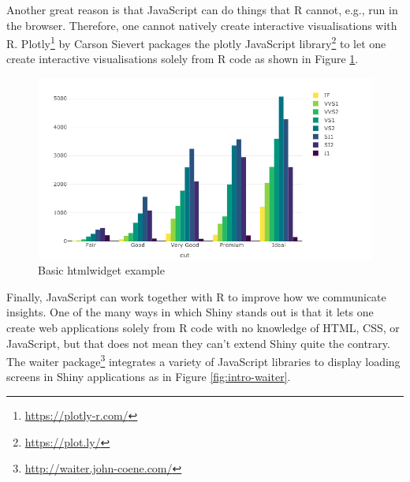 \documentclass[10pt,]{krantz}
\makeatletter
\newenvironment{Shaded}{\begin{snugshade}}{\end{snugshade}}
\newcommand{\DataTypeTok}[1]{\textcolor[rgb]{0.27,0.27,0.27}{#1}}
\newcommand{\KeywordTok}[1]{\textcolor[rgb]{0.27,0.27,0.27}{\textbf{#1}}}
\newcommand{\NormalTok}[1]{#1}
\newcommand{\OperatorTok}[1]{\textcolor[rgb]{0.43,0.43,0.43}{\textbf{#1}}}
\newcommand{\StringTok}[1]{\textcolor[rgb]{0.5,0.5,0.5}{#1}}
\renewcommand{\href}[2]{#2\footnote{\url{#1}}}
\newenvironment{kframe}{%
\medskip{}
\setlength{\fboxsep}{.8em}
 \def\at@end@of@kframe{}%
 \ifinner\ifhmode%
  \def\at@end@of@kframe{\end{minipage}}%
  \begin{minipage}{\columnwidth}%
 \fi\fi%
 \def\FrameCommand##1{\hskip\@totalleftmargin \hskip-\fboxsep
 \colorbox{shadecolor}{##1}\hskip-\fboxsep
     \hskip-\linewidth \hskip-\@totalleftmargin \hskip\columnwidth}%
 \MakeFramed {\advance\hsize-\width
   \@totalleftmargin\z@ \linewidth\hsize
   \@setminipage}}%
 {\par\unskip\endMakeFramed%
 \at@end@of@kframe}
\renewenvironment{Shaded}{\begin{kframe}}{\end{kframe}}
\makeatother
\begin{document}
Another great reason is that JavaScript can do things that R cannot, e.g., run in the browser. Therefore, one cannot natively create interactive visualisations with R. \href{https://plotly-r.com/}{Plotly} \citep{R-plotly} by Carson Sievert packages the \href{https://plot.ly/}{plotly JavaScript library} to let one create interactive visualisations solely from R code as shown in Figure \ref{fig:plotly-basic-example}.

\begin{Shaded}
\end{Shaded}

\begin{figure}[H]

{\centering \includegraphics[width=1\linewidth]{images/01-plotly} 

}

\caption{Basic htmlwidget example}\label{fig:plotly-basic-example}
\end{figure}

Finally, JavaScript can work together with R to improve how we communicate insights. One of the many ways in which Shiny stands out is that it lets one create web applications solely from R code with no knowledge of HTML, CSS, or JavaScript, but that does not mean they can't extend Shiny quite the contrary. The \href{http://waiter.john-coene.com/}{waiter package} \citep{R-waiter} integrates a variety of JavaScript libraries to display loading screens in Shiny applications as in Figure \ref{fig:intro-waiter}.
\end{document}
